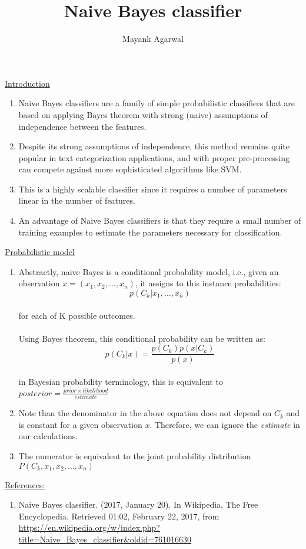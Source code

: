 \documentclass[11pt]{article}
\begin{document}
 
 
\title{Naive Bayes classifier}
\author{Mayank Agarwal}
\maketitle

\underline{Introduction}
\begin{enumerate}

\item Naive Bayes classifiers are a family of simple probabilistic classifiers that are based on applying Bayes theorem with strong (naive) assumptions of independence between the features.

\item Despite its strong assumptions of independence, this method remains quite popular in text categorization applications, and with proper pre-processing can compete against more sophisticated algorithms like SVM.

\item This is a highly scalable classifier since it requires a number of parameters linear in the number of features.

\item An advantage of Naive Bayes classifiers is that they require a small number of training examples to estimate the parameters necessary for classification.

\end{enumerate}

\underline{Probabilistic model}
\begin{enumerate}

\item Abstractly, naive Bayes is a conditional probability model, i.e., given an observation $x = (x_1, x_2, ..., x_n)$, it assigns to this instance probabilities:\\
$$p(C_k | x_1, ..., x_n)$$ \\
for each of K possible outcomes.\\
\\
Using Bayes theorem, this conditional probability can be written as: \\
$$p(C_k | x) = \frac{p(C_k) p(x | C_k)}{p(x)}$$\\
in Bayesian probability terminology, this is equivalent to $posterior = \frac{prior \times likelihood}{estimate}$\\

\item Note than the denominator in the above equation does not depend on $C_k$ and is constant for a given observation $x$. Therefore, we can ignore the \textit{estimate} in our calculations. 

\item The numerator is equivalent to the joint probability distribution $P(C_k, x_1, x_2, ..., x_n)$

\end{enumerate}

\underline{References:}
\begin{enumerate}
\item Naive Bayes classifier. (2017, January 20). In Wikipedia, The Free Encyclopedia. Retrieved 01:02, February 22, 2017, from \url{https://en.wikipedia.org/w/index.php?title=Naive_Bayes_classifier&oldid=761016630}
\end{enumerate}
\end{document}
